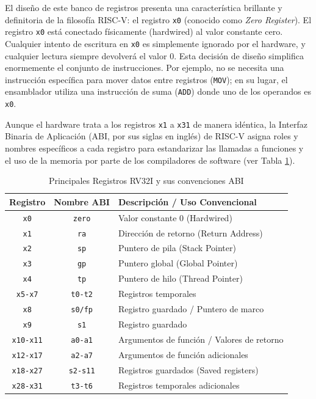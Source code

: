 El diseño de este banco de registros presenta una característica brillante y definitoria de la filosofía RISC-V: el registro \texttt{x0} (conocido como \textit{Zero Register}). El registro \texttt{x0} está conectado físicamente (hardwired) al valor constante cero. Cualquier intento de escritura en \texttt{x0} es simplemente ignorado por el hardware, y cualquier lectura siempre devolverá el valor 0. Esta decisión de diseño simplifica enormemente el conjunto de instrucciones. Por ejemplo, no se necesita una instrucción específica para mover datos entre registros (\texttt{MOV}); en su lugar, el ensamblador utiliza una instrucción de suma (\texttt{ADD}) donde uno de los operandos es \texttt{x0}.

Aunque el hardware trata a los registros \texttt{x1} a \texttt{x31} de manera idéntica, la Interfaz Binaria de Aplicación (ABI, por sus siglas en inglés) de RISC-V asigna roles y nombres específicos a cada registro para estandarizar las llamadas a funciones y el uso de la memoria por parte de los compiladores de software (ver Tabla \ref{tab:registros_abi}).

\begin{table}[h!]
\centering
\caption{Principales Registros RV32I y sus convenciones ABI}
\label{tab:registros_abi}
\begin{tabular}{|c|c|l|}
\hline
\textbf{Registro} & \textbf{Nombre ABI} & \textbf{Descripción / Uso Convencional} \\ \hline
\texttt{x0}       & \texttt{zero}       & Valor constante 0 (Hardwired) \\ \hline
\texttt{x1}       & \texttt{ra}         & Dirección de retorno (Return Address) \\ \hline
\texttt{x2}       & \texttt{sp}         & Puntero de pila (Stack Pointer) \\ \hline
\texttt{x3}       & \texttt{gp}         & Puntero global (Global Pointer) \\ \hline
\texttt{x4}       & \texttt{tp}         & Puntero de hilo (Thread Pointer) \\ \hline
\texttt{x5-x7}    & \texttt{t0-t2}      & Registros temporales \\ \hline
\texttt{x8}       & \texttt{s0/fp}      & Registro guardado / Puntero de marco \\ \hline
\texttt{x9}       & \texttt{s1}         & Registro guardado \\ \hline
\texttt{x10-x11}  & \texttt{a0-a1}      & Argumentos de función / Valores de retorno \\ \hline
\texttt{x12-x17}  & \texttt{a2-a7}      & Argumentos de función adicionales \\ \hline
\texttt{x18-x27}  & \texttt{s2-s11}     & Registros guardados (Saved registers) \\ \hline
\texttt{x28-x31}  & \texttt{t3-t6}      & Registros temporales adicionales \\ \hline
\end{tabular}
\end{table}

